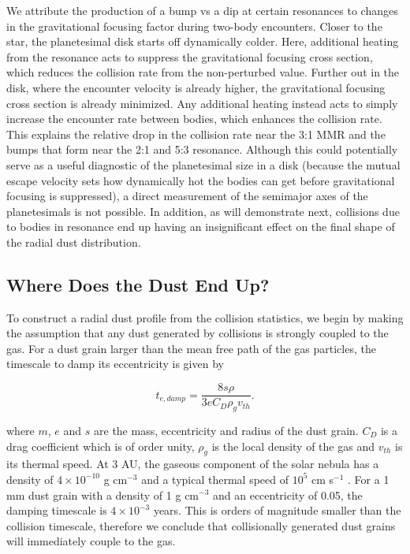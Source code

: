 \documentclass[onecolumn]{aastex63}
\begin{document}
We attribute the production of a bump vs a dip at certain resonances to changes in the gravitational focusing factor during two-body encounters. Closer to the star, the planetesimal disk starts off dynamically colder. Here, additional heating from the resonance acts to suppress the gravitational focusing cross section, which reduces the collision rate from the non-perturbed value. Further out in the disk, where the encounter velocity is already higher, the gravitational focusing cross section is already minimized. Any additional heating instead acts to simply increase the encounter rate between bodies, which enhances the collision rate. This explains the relative drop in the collision rate near the 3:1 MMR and the bumps that form near the 2:1 and 5:3 resonance. Although this could potentially serve as a useful diagnostic of the planetesimal size in a disk (because the mutual escape velocity sets how dynamically hot the bodies can get before gravitational focusing is suppressed), a direct measurement of the semimajor axes of the planetesimals is not possible. In addition, as will demonstrate next, collisions due to bodies in resonance end up having an insignificant effect on the final shape of the radial dust distribution.

\subsection{Where Does the Dust End Up?}

To construct a radial dust profile from the collision statistics, we begin by making the assumption that any dust generated by collisions is strongly coupled to the gas. For a dust grain larger than the mean free path of the gas particles, the timescale to damp its eccentricity is given by \citep{1976PThPh..56.1756A}

\begin{equation}\label{eq:t_edamp}
    t_{e, damp} = \frac{8 s \rho}{3 e C_{D} \rho_{g} v_{th}}.
\end{equation}

\noindent where $m$, $e$ and $s$ are the mass, eccentricity and radius of the dust grain. $C_{D}$ is a drag coefficient which is of order unity, $\rho_{g}$ is the local density of the gas and $v_{th}$ is its thermal speed. At 3 AU, the gaseous component of the solar nebula has a density of $4 \times 10^{-10}$ g cm$^{-3}$ and a typical thermal speed of $10^{5}$ cm s$^{-1}$ \citep{1981PThPS..70...35H}. For a 1 mm dust grain with a density of 1 g cm$^{-3}$ and an eccentricity of 0.05, the damping timescale is $4 \times 10^{-3}$ years. This is orders of magnitude smaller than the collision timescale, therefore we conclude that collisionally generated dust grains will immediately couple to the gas.
\end{document}
